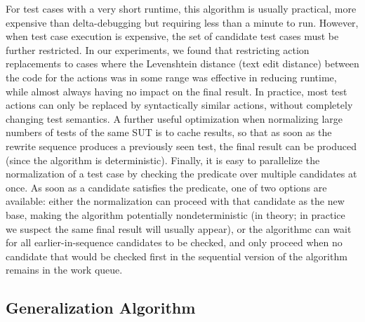For test cases with a very short runtime, this algorithm is usually
practical, more expensive than delta-debugging but requiring less than
a minute to run.  However, when test case execution is expensive, the
set of candidate test cases must be further restricted.  In our
experiments, we found that restricting action replacements to cases
where the Levenshtein \cite{Lev} distance (text edit distance) between
the code for the actions was in some range was effective in reducing
runtime, while almost always having no impact on the final result.  In
practice, most test actions can only be replaced by syntactically
similar actions, without completely changing test semantics.  A
further useful optimization when normalizing large numbers of tests of
the same SUT is to cache results, so that as soon as the rewrite
sequence produces a previously seen test, the final result can be
produced (since the algorithm is deterministic).  Finally, it is easy
to parallelize the normalization of a test case by checking the
predicate over multiple candidates at once.  As soon as a candidate
satisfies the predicate, one of two options are available:  either the
normalization can proceed with that candidate as the new base, making
the algorithm potentially nondeterministic (in theory; in practice we
suspect the same final result will usually appear), or the algorithmc
can wait for all earlier-in-sequence candidates to be checked, and
only proceed when no candidate that would be checked first in the
sequential version of the algorithm remains in the work queue.

\subsection{Generalization Algorithm}